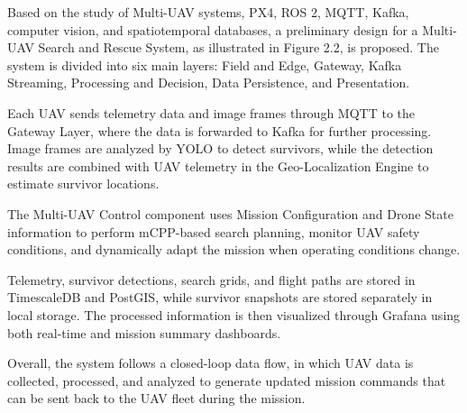 \documentclass[12pt]{article}
\newcommand{\infofont}{\fontsize{16pt}{19.2pt}\selectfont}
\begin{document}
\infofont
Based on the study of Multi-UAV systems, PX4, ROS 2, MQTT, Kafka, computer vision,
and spatiotemporal databases, a preliminary design for a Multi-UAV Search and Rescue
System, as illustrated in Figure 2.2, is proposed. The system is divided into six main layers:
Field and Edge, Gateway, Kafka Streaming, Processing and Decision, Data Persistence, and
Presentation.

Each UAV sends telemetry data and image frames through MQTT to the Gateway
Layer, where the data is forwarded to Kafka for further processing. Image frames are
analyzed by YOLO to detect survivors, while the detection results are combined with UAV
telemetry in the Geo-Localization Engine to estimate survivor locations.

The Multi-UAV Control component uses Mission Configuration and Drone State
information to perform mCPP-based search planning, monitor UAV safety conditions, and
dynamically adapt the mission when operating conditions change.

Telemetry, survivor detections, search grids, and flight paths are stored in TimescaleDB
and PostGIS, while survivor snapshots are stored separately in local storage. The processed
information is then visualized through Grafana using both real-time and mission summary
dashboards.

Overall, the system follows a closed-loop data flow, in which UAV data is collected,
processed, and analyzed to generate updated mission commands that can be sent back to
the UAV fleet during the mission.
\end{document}
